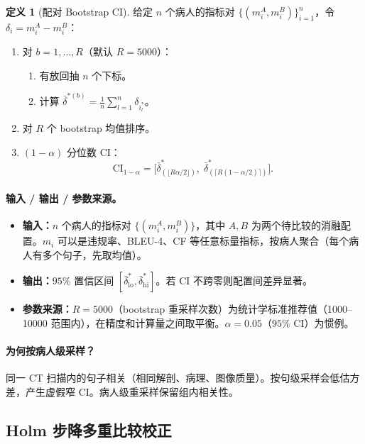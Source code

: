 \documentclass[11pt,a4paper]{article}
\theoremstyle{definition}
\newtheorem{definition}{定义}[section]
\begin{document}
\begin{definition}[配对 Bootstrap CI]
给定 $n$ 个病人的指标对 $\{(m_i^A, m_i^B)\}_{i=1}^{n}$，令 $\delta_i = m_i^A - m_i^B$：
\begin{enumerate}
    \item 对 $b = 1,\ldots,R$（默认 $R=5000$）：
    \begin{enumerate}[label=(\alph*)]
        \item 有放回抽 $n$ 个下标。
        \item 计算 $\bar{\delta}^{*(b)} = \frac{1}{n}\sum_{l=1}^n \delta_{i_l^*}$。
    \end{enumerate}
    \item 对 $R$ 个 bootstrap 均值排序。
    \item $(1-\alpha)$ 分位数 CI：
    \begin{equation}
    \mathrm{CI}_{1-\alpha} = \Big[\bar{\delta}^*_{(\lfloor R\alpha/2\rfloor)},\;\bar{\delta}^*_{(\lceil R(1-\alpha/2)\rceil)}\Big].
    \end{equation}
\end{enumerate}
\end{definition}

\paragraph{输入 / 输出 / 参数来源。}
\begin{itemize}[nosep]
    \item \textbf{输入：}$n$ 个病人的指标对 $\{(m_i^A, m_i^B)\}$，其中 $A, B$ 为两个待比较的消融配置。$m_i$ 可以是违规率、BLEU-4、CF 等任意标量指标，按病人聚合（每个病人有多个句子，先取均值）。
    \item \textbf{输出：}$95\%$ 置信区间 $[\bar{\delta}^*_{\mathrm{lo}}, \bar{\delta}^*_{\mathrm{hi}}]$。若 CI 不跨零则配置间差异显著。
    \item \textbf{参数来源：}$R=5000$（bootstrap 重采样次数）为统计学标准推荐值（1000--10000 范围内），在精度和计算量之间取平衡。$\alpha=0.05$（$95\%$ CI）为惯例。
\end{itemize}

\paragraph{为何按病人级采样？}同一 CT 扫描内的句子相关（相同解剖、病理、图像质量）。按句级采样会低估方差，产生虚假窄 CI。病人级重采样保留组内相关性。


\subsection{Holm 步降多重比较校正}
\end{document}
